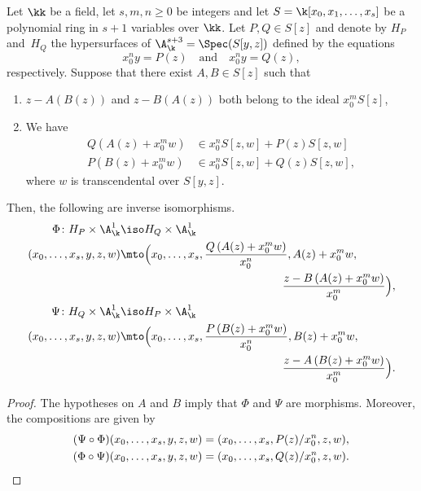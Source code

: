 \begin{lemma}\label{Lemma-Iso}
Let $\kk$ be a field, let $s,m,n\geq0$ be integers and let $S=\k[x_0,x_1,\ldots,x_s]$ be a polynomial ring in $s+1$ variables over $\kk$.
Let $P,Q\in S[z]$ and denote by $H_P$ and~$H_Q$ the hypersurfaces of $\A^{s+3}_{\k}=\Spec(S[y,z])$ defined by the equations
\[
x_0^ny=P(z) \quad \text{and}
\quad x_0^ny=Q(z),
\]
respectively. Suppose that there exist $A,B\in S[z]$ such that
\begin{enumerate}
\item $z-A(B(z))$ and $z-B(A(z))$ both belong to the ideal $x_0^{m}S[z]$,
\item We have
\begin{align*}
Q\left(A(z)+x_0^{m}w\right)&\in x_0^nS[z,w]+P(z)S[z,w]\\
\tag*{and}
P\left(B(z)+x_0^{m}w\right)&\in x_0^nS[z,w]+Q(z)S[z,w],
\end{align*}
where $w$ is transcendental over $S[y,z]$.
\end{enumerate}
Then, the following are inverse isomorphisms.
\begin{align*}
\Phi\colon H_P\times\A^1_{\k} &\iso H_Q\times\A^1_{\k}\\
(x_0,\ldots,x_s,y,z,w) &\mto \Bigl(x_0,\ldots,x_s,\frac{Q\left(A(z)+x_0^{m}w\right)}{x_0^n},  A(z)+x_0^{m}w,\\
&\hspace*{5cm}\frac{z-B\left(A(z)+x_0^{m}w\right)}{x_0^{m}}\Bigr),\\
\Psi\colon H_Q \times\A^1_{\k} &\iso H_P\times\A^1_{\k}\\
(x_0,\ldots,x_s,y,z,w) &\mto \Bigl(x_0,\ldots,x_s,\frac{P\left(B(z)+x_0^{m}w\right)}{x_0^n}, B(z)+x_0^{m}w,\\
&\hspace*{5cm}\frac{z-A\left(B(z)+x_0^{m}w\right)}{x_0^{m}}\Bigr).
\end{align*}
\end{lemma}

\begin{proof}
The hypotheses on $A$ and $B$ imply that $\Phi$ and $\Psi$ are morphisms. Moreover, the compositions are given by
\begin{align*}
(\Psi\circ\Phi)(x_0,\ldots,x_s,y,z,w)&=(x_0,\ldots,x_s,P(z)/x_0^n,z,w),\\
(\Phi\circ\Psi)(x_0,\ldots,x_s,y,z,w)&=(x_0,\ldots,x_s,Q(z)/x_0^n,z,w).\qedhere
\end{align*}
\end{proof}

